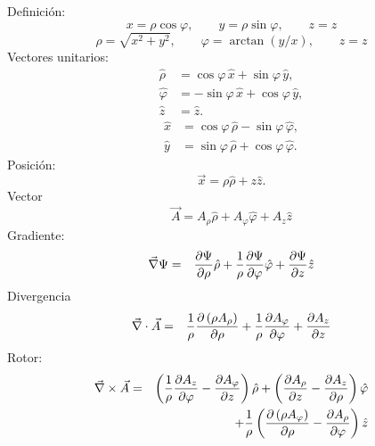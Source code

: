 \noindent Definición:
\begin{equation}
    x  =  \rho\cos\varphi , \qquad
    y  =  \rho\sin\varphi , \qquad
    z =  z
\end{equation}
\begin{equation}
    \rho  =  \sqrt{x^2 + y^2} , \qquad
    \varphi  = \arctan{(y/x)}, \qquad
     z=  z
\end{equation}
Vectores unitarios:
\begin{align}
    \hat{\rho} &= %
    				 \cos \varphi \,\hat{x} + \sin \varphi \,\hat{y}, \\
    \hat{\varphi} &= %
    				- \sin \varphi \,\hat{x} + \cos \varphi \, \hat{y},  \\
    \hat{z} &= %
    			\hat{z} .
\end{align}
\begin{align}
    \hat{x} &= \cos \varphi \,\hat{\rho} - \sin \varphi \, \hat{\varphi}, \\
    \hat{y} &= \sin\varphi \, \hat{\rho} + \cos \varphi \,\hat{\varphi}.
\end{align}
Posición:
\begin{equation}
\vec{x} = \rho \hat{\rho} + z \hat{z}.
\end{equation}
Vector
\begin{equation}
\vec{A} =A_\rho {\hat \rho} + A_\varphi {\hat \varphi} +
A_z {\hat z}
\end{equation}
Gradiente:
\begin{eqnarray}
 \vec\nabla\Psi&=&{\partial\Psi\over \partial \rho} {\hat \rho}
  + {1 \over \rho}{\partial\Psi\over \partial \varphi} {\hat \varphi}
  + {\partial\Psi\over \partial z} {\hat z}
\end{eqnarray}
Divergencia
\begin{eqnarray}
 \vec\nabla \cdot \vec{A}
&=&  {1 \over \rho}{\partial \left( \rho A_\rho  \right) \over \partial
\rho}  + {1 \over \rho}{\partial A_\varphi \over \partial \varphi}
  + {\partial A_z \over \partial z}
\end{eqnarray}
Rotor:
\begin{eqnarray}
\vec\nabla \times  \vec{A}
&=&   \left({1 \over \rho}{\partial A_z \over \partial \varphi}
    - {\partial A_\varphi \over \partial z}\right)  {\hat \rho} +
\left({\partial A_\rho \over \partial z} - {\partial A_z \over
\partial \rho}\right)  {\hat \varphi} \nonumber\\
&&+  {1 \over \rho}\left({\partial \left( \rho A_\varphi \right) \over
\partial \rho}     - {\partial A_\rho \over \partial \varphi}\right) {\hat z}
\end{eqnarray}
